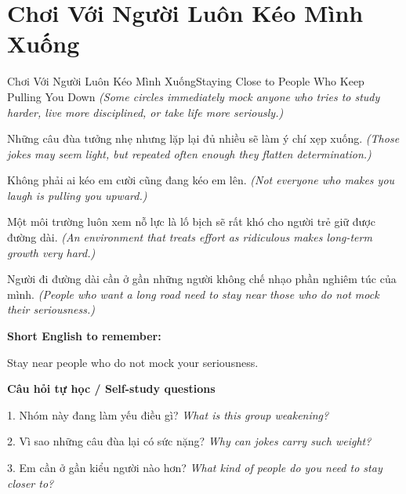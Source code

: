 \section{Chơi Với Người Luôn Kéo Mình Xuống}
\begin{truyen}{Chơi Với Người Luôn Kéo Mình Xuống}{Staying Close to People Who Keep Pulling You Down}
\textit{(Some circles immediately mock anyone who tries to study harder, live more disciplined, or take life more seriously.)}

Những câu đùa tưởng nhẹ nhưng lặp lại đủ nhiều sẽ làm ý chí xẹp xuống.
\textit{(Those jokes may seem light, but repeated often enough they flatten determination.)}

Không phải ai kéo em cười cũng đang kéo em lên.
\textit{(Not everyone who makes you laugh is pulling you upward.)}

Một môi trường luôn xem nỗ lực là lố bịch sẽ rất khó cho người trẻ giữ được đường dài.
\textit{(An environment that treats effort as ridiculous makes long-term growth very hard.)}

\end{truyen}

\begin{baihoc}
Người đi đường dài cần ở gần những người không chế nhạo phần nghiêm túc của mình.
\textit{(People who want a long road need to stay near those who do not mock their seriousness.)}
\end{baihoc}

\begin{ghinhoanh}
\textbf{Short English to remember:}

Stay near people who do not mock your seriousness.

\end{ghinhoanh}

\begin{tuhocnhanh}
\textbf{Câu hỏi tự học / Self-study questions}

1. Nhóm này đang làm yếu điều gì? \textit{What is this group weakening?}

2. Vì sao những câu đùa lại có sức nặng? \textit{Why can jokes carry such weight?}

3. Em cần ở gần kiểu người nào hơn? \textit{What kind of people do you need to stay closer to?}
\end{tuhocnhanh}
\ngancach


